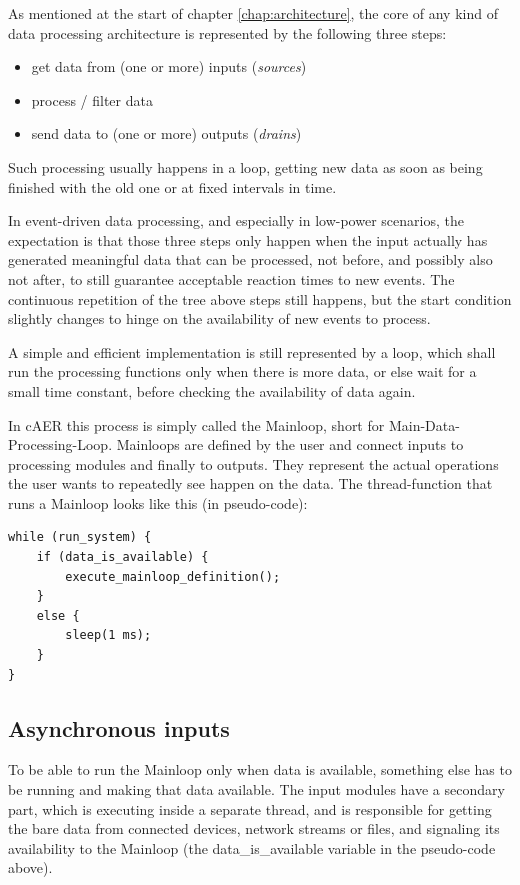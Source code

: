 \documentclass[a4paper,12pt]{report}
\begin{document}
As mentioned at the start of chapter \ref{chap:architecture}, the core of any kind of data processing architecture is represented by the following three steps:
\begin{itemize}
\item get data from (one or more) inputs (\emph{sources})
\item process / filter data
\item send data to (one or more) outputs (\emph{drains})
\end{itemize}
Such processing usually happens in a loop, getting new data as soon as being finished with the old one or at fixed intervals in time.

In event-driven data processing, and especially in low-power scenarios, the expectation is that those three steps only happen when the input actually has generated meaningful data that can be processed, not before, and possibly also not after, to still guarantee acceptable reaction times to new events.
The continuous repetition of the tree above steps still happens, but the start condition slightly changes to hinge on the availability of new events to process.

A simple and efficient implementation is still represented by a loop, which shall run the processing functions only when there is more data, or else wait for a small time constant, before checking the availability of data again.

In cAER this process is simply called the Mainloop, short for Main-Data-Processing-Loop.
Mainloops are defined by the user and connect inputs to processing modules and finally to outputs.
They represent the actual operations the user wants to repeatedly see happen on the data.
\clearpage
The thread-function that runs a Mainloop looks like this (in pseudo-code):

\begin{lstlisting}
while (run_system) {
    if (data_is_available) {
        execute_mainloop_definition();
    }
    else {
        sleep(1 ms);
    }
}
\end{lstlisting}

\subsection{Asynchronous inputs} \label{sec:asynchronous_inputs}

To be able to run the Mainloop only when data is available, something else has to be running and making that data available. The input modules have a secondary part, which is executing inside a separate thread, and is responsible for getting the bare data from connected devices, network streams or files, and signaling its availability to the Mainloop (the data\_is\_available variable in the pseudo-code above).
\end{document}
